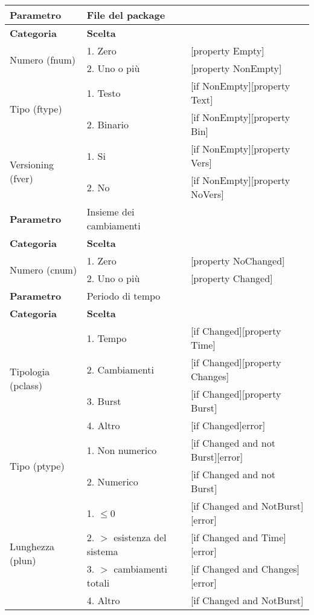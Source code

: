 \begin{tabular}{|p{4cm}|p{4cm}p{5cm}|}
	\hline
	\cellcolor{Gray} \textbf{Parametro}		& File del package	&											\tabularnewline
	\hline
	\rowcolor{Gray}
	\textbf{Categoria} 						& \textbf{Scelta}			&									\tabularnewline
	\hline
	\multirow{2}{*}{Numero (fnum)} 			& 1. Zero 					&	[property Empty] 				\tabularnewline
	\cline{2-3}
											& 2. Uno o più				&	[property NonEmpty]				\tabularnewline
	\hline
	\multirow{2}{*}{Tipo (ftype)} 			& 1. Testo					&	[if NonEmpty][property Text] 	\tabularnewline
	\cline{2-3}
											& 2. Binario				&	[if NonEmpty][property Bin]		\tabularnewline
	\hline
	\multirow{2}{*}{Versioning (fver)}		& 1. Si						&	[if NonEmpty][property Vers]	\tabularnewline
	\cline{2-3}
											& 2. No						&	[if NonEmpty][property NoVers]	\tabularnewline
	\hline
	
	
	\cellcolor{Gray} \textbf{Parametro}		& Insieme dei cambiamenti	&									\tabularnewline
	\hline
	\rowcolor{Gray}
	\textbf{Categoria} 						& \textbf{Scelta}			&									\tabularnewline
	\hline
	\multirow{2}{*}{Numero (cnum)} 			& 1. Zero 					&	[property NoChanged]			\tabularnewline
	\cline{2-3}
											& 2. Uno o più				&	[property Changed]				\tabularnewline
	\hline	
	
	
	\cellcolor{Gray} \textbf{Parametro}		& Periodo di tempo			&									\tabularnewline
	\hline
	\rowcolor{Gray}
	\textbf{Categoria} 						& \textbf{Scelta}			&									\tabularnewline
	\hline
	\multirow{4}{*}{Tipologia (pclass)} 	& 1. Tempo 					&	[if Changed][property Time]				 	\tabularnewline
	\cline{2-3}
											& 2. Cambiamenti			&	[if Changed][property Changes]				\tabularnewline
	\cline{2-3}
											& 3. Burst 					&	[if Changed][property Burst]				\tabularnewline
	\cline{2-3}
											& 4. Altro 					&	[if Changed]error]							\tabularnewline
	\hline
	\multirow{2}{*}{Tipo (ptype)} 			& 1. Non numerico 			&	[if Changed and not Burst][error]		 	\tabularnewline
	\cline{2-3}
											& 2. Numerico 				&	[if Changed and not Burst]					\tabularnewline
	\hline
	\multirow{4}{*}{Lunghezza (plun)} 		& 1. $\leq 0$					&	[if Changed and NotBurst][error] 		\tabularnewline
	\cline{2-3}
											& 2. $>$ esistenza del sistema 	& 	[if Changed and Time][error]			\tabularnewline
	\cline{2-3}
											& 3. $>$ cambiamenti totali		&	[if Changed and Changes][error]			\tabularnewline
	\cline{2-3}
											& 4. Altro						&	[if Changed and NotBurst]				\tabularnewline
	\hline
\end{tabular}

\vspace{1cm}

